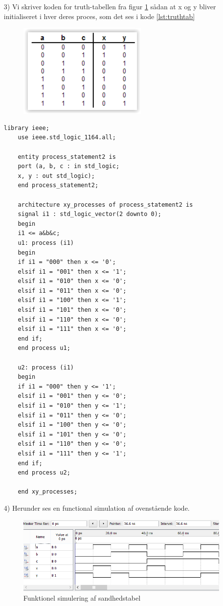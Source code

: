 \begin{enumerate}
	\item[3)]
	Vi skriver koden for truth-tabellen fra figur \ref{fig:Truthtabel} sådan at x og y bliver initialiseret i hver deres proces, som det ses i kode \ref{lst:truthtab} 
	\begin{figure}[h]
		\centering
		\includegraphics[scale=0.8]{pictures/Oevelse5/opg1/truthtabel.JPG}
		\caption{}
		\label{fig:Truthtabel}
	\end{figure}
	\begin{lstlisting}[caption={Behavioral style kode for truth tabellen},label={lst:truthtab}]
	library ieee;
	use ieee.std_logic_1164.all;
	
	entity process_statement2 is 
	port (a, b, c : in std_logic;
	x, y : out std_logic);
	end process_statement2;
	
	architecture xy_processes of process_statement2 is
	signal i1 : std_logic_vector(2 downto 0);
	begin
	i1 <= a&b&c;
	u1: process (i1)
	begin
	if i1 = "000" then x <= '0';
	elsif i1 = "001" then x <= '1';
	elsif i1 = "010" then x <= '0';
	elsif i1 = "011" then x <= '0';
	elsif i1 = "100" then x <= '1';
	elsif i1 = "101" then x <= '0';
	elsif i1 = "110" then x <= '0';
	elsif i1 = "111" then x <= '0';
	end if;
	end process u1;
	
	u2: process (i1)
	begin
	if i1 = "000" then y <= '1';
	elsif i1 = "001" then y <= '0';
	elsif i1 = "010" then y <= '1';
	elsif i1 = "011" then y <= '0';
	elsif i1 = "100" then y <= '0';
	elsif i1 = "101" then y <= '0';
	elsif i1 = "110" then y <= '0';
	elsif i1 = "111" then y <= '1';
	end if;
	end process u2;
	
	end xy_processes;
	\end{lstlisting}
\item[4)]	
Herunder ses en functional simulation af ovenstående kode.
\begin{figure}[h]
		\centering
		\includegraphics[scale=0.75]{pictures/Oevelse5/opg1/func_sim_truth.JPG}
		\caption{Funktionel simulering af sandhedstabel}
		\label{fig:FunctionalsimulationafTruthtabel.}
	\end{figure}
\end{enumerate}